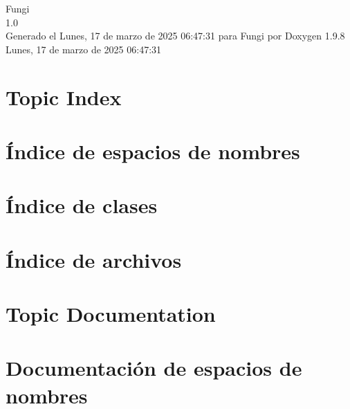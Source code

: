 \documentclass[twoside]{book}
\newcommand{\+}{\discretionary{\mbox{\scriptsize$\hookleftarrow$}}{}{}}
\newcommand{\clearemptydoublepage}{%
    \newpage{\pagestyle{empty}\cleardoublepage}%
  }
\begin{document}
  \raggedbottom
    \hypersetup{pageanchor=false,
                bookmarksnumbered=true,
                pdfencoding=unicode
               }
  \begin{titlepage}
  \vspace*{7cm}
  \begin{center}%
  {\Large Fungi}\\
  [1ex]\large 1.\+0 \\
  \vspace*{1cm}
  {\large Generado el Lunes, 17 de marzo de 2025 06\+:47\+:31 para Fungi por Doxygen 1.9.8}\\
    \vspace*{0.5cm}
    {\small Lunes, 17 de marzo de 2025 06:47:31}
  \end{center}
  \end{titlepage}
  \clearemptydoublepage
  \tableofcontents
  \clearemptydoublepage
  \hypersetup{pageanchor=true}

\chapter{Topic Index}

\chapter{Índice de espacios de nombres}

\chapter{Índice de clases}

\chapter{Índice de archivos}

\chapter{Topic Documentation}

\chapter{Documentación de espacios de nombres}




\end{document}
